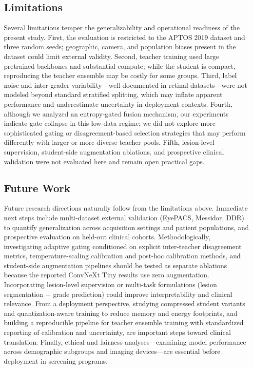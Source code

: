 \documentclass[a4paper,fleqn]{cas-dc}
\begin{document}
\subsection{Limitations}
\label{sec:limitations}

Several limitations temper the generalizability and operational readiness of the present study. First, the evaluation is restricted to the APTOS 2019 dataset and three random seeds; geographic, camera, and population biases present in the dataset could limit external validity. Second, teacher training used large pretrained backbones and substantial compute; while the student is compact, reproducing the teacher ensemble may be costly for some groups. Third, label noise and inter-grader variability—well-documented in retinal datasets—were not modeled beyond standard stratified splitting, which may inflate apparent performance and underestimate uncertainty in deployment contexts. Fourth, although we analyzed an entropy-gated fusion mechanism, our experiments indicate gate collapse in this low-data regime; we did not explore more sophisticated gating or disagreement-based selection strategies that may perform differently with larger or more diverse teacher pools. Fifth, lesion-level supervision, student-side augmentation ablations, and prospective clinical validation were not evaluated here and remain open practical gaps.

\subsection{Future Work}
\label{sec:future_work}

Future research directions naturally follow from the limitations above. Immediate next steps include multi-dataset external validation (EyePACS, Messidor, DDR) to quantify generalization across acquisition settings and patient populations, and prospective evaluation on held-out clinical cohorts. Methodologically, investigating adaptive gating conditioned on explicit inter-teacher disagreement metrics, temperature-scaling calibration and post-hoc calibration methods, and student-side augmentation pipelines should be tested as separate ablations because the reported ConvNeXt Tiny results use zero augmentation. Incorporating lesion-level supervision or multi-task formulations (lesion segmentation + grade prediction) could improve interpretability and clinical relevance. From a deployment perspective, studying compressed student variants and quantization-aware training to reduce memory and energy footprints, and building a reproducible pipeline for teacher ensemble training with standardized reporting of calibration and uncertainty, are important steps toward clinical translation. Finally, ethical and fairness analyses—examining model performance across demographic subgroups and imaging devices—are essential before deployment in screening programs.
\end{document}
